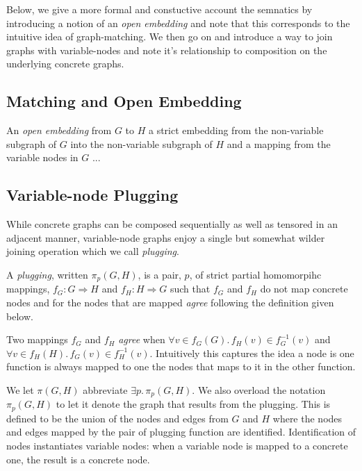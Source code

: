 \documentclass[runningheads]{llncs}
\begin{document}
Below, we give a more formal and constuctive account the semnatics by
introducing a notion of an \emph{open embedding} and note that this
corresponds to the intuitive idea of graph-matching. We then go on and
introduce a way to join graphs with variable-nodes and note it's
relationship to composition on the underlying concrete graphs. 

\subsection{Matching and Open Embedding}

\begin{definition}
  An \emph{open embedding} from $G$ to $H$ a strict embedding from the
  non-variable subgraph of $G$ into the non-variable subgraph of $H$
  and a mapping from the variable nodes in $G$ ...
\end{definition}


\subsection{Variable-node Plugging}

While concrete graphs can be composed sequentially as well as tensored
in an adjacent manner, variable-node graphs enjoy a single but
somewhat wilder joining operation which we call \emph{plugging}. 

\begin{definition}
  A \emph{plugging}, written $\pi_{p}(G,H)$, is a pair, $p$, of
  strict partial homomorpihc mappings, $f_G : G \Longrightarrow H$ and
  $f_H : H \Longrightarrow G$ such that $f_G$ and $f_H$ do not map
  concrete nodes and for the nodes that are mapped \emph{agree}
  following the definition given below.
\end{definition}

\begin{definition}
  Two mappings $f_G$ and $f_H$ \emph{agree} when $\forall v \in
  f_G(G).\, f_H(v) \in f^{-1}_G(v)$ and $\forall v \in f_H(H).\,
  f_G(v) \in f^{-1}_H(v)$. Intuitively this captures the idea a node
  is one function is always mapped to one the nodes that maps to it in
  the other function.
\end{definition}

We let $\pi(G,H)$ abbreviate $\exists p.\,\pi_p(G,H)$. We also
overload the notation $\pi_p(G,H)$ to let it denote the graph that
results from the plugging. This is defined to be the union of the
nodes and edges from $G$ and $H$ where the nodes and edges mapped by
the pair of plugging function are identified. Identification of nodes
instantiates variable nodes: when a variable node is mapped to a
concrete one, the result is a concrete node.
\end{document}
